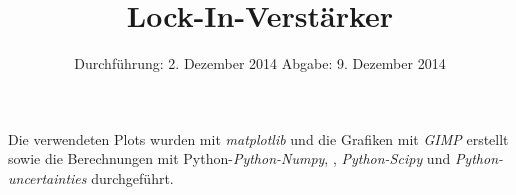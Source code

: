 
\usepackage{marvosym}
\subject{Anfängerpraktikum V303}
\title{Lock-In-Verstärker
}
\date{
  Durchführung: 2. Dezember 2014
  \hspace{1em}
  Abgabe: 9. Dezember 2014
}


\maketitle
\thispagestyle{empty}
\newpage





\printbibliography
\noindent Die verwendeten Plots wurden mit \textit{matplotlib}\cite{matplotlib} und die Grafiken mit \textit{GIMP}\cite{gimp} erstellt sowie die Berechnungen mit Python-\textit{Python-Numpy}, \cite{numpy}, \textit{Python-Scipy}\cite{scipy} und \textit{Python-uncertainties}\cite{uncertainties} durchgeführt.

